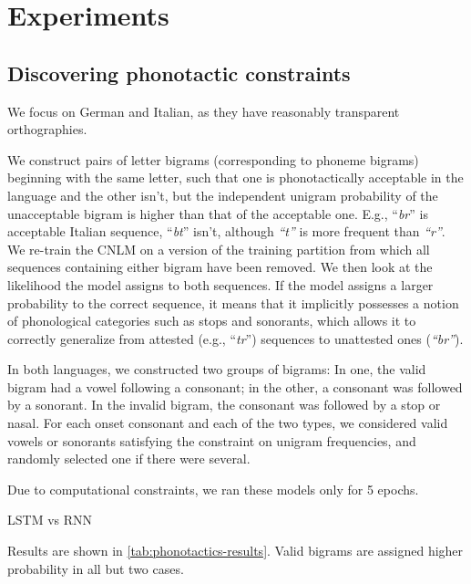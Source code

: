\section{Experiments}
\label{sec:experiments}

\subsection{Discovering phonotactic constraints}
\label{sec:phonotactics}

We focus on German and Italian, as they have reasonably transparent orthographies.


We construct pairs of letter bigrams (corresponding to phoneme
bigrams) beginning with the same letter, such that one is
phonotactically acceptable in the language and the other isn't, but
the independent unigram probability of the unacceptable bigram is
higher than that of the acceptable one. E.g., ``\emph{br}'' is
acceptable Italian sequence, ``\emph{bt}'' isn't, although
\emph{``t''} is more frequent than \emph{``r''}. We re-train the CNLM on a version of
the training partition from which all sequences containing either bigram have been removed. We then look at
the likelihood the model assigns to both sequences. If the model
assigns a larger probability to the correct sequence, it means that it
implicitly possesses a notion of phonological categories such as
stops and sonorants, which allows it to correctly generalize from
attested (e.g., ``\emph{tr}'') sequences to unattested ones
(\emph{``br''}).


In both languages, we constructed two groups of bigrams:
In one, the valid bigram had a vowel following a consonant; in the other, a consonant was followed by a sonorant.
In the invalid bigram, the consonant was followed by a stop or nasal.
For each onset consonant and each of the two types, we considered valid vowels or sonorants satisfying the constraint on unigram frequencies, and randomly selected one if there were several.


Due to computational constraints, we ran these models only for 5 epochs.

LSTM vs RNN

Results are shown in \ref{tab:phonotactics-results}.
Valid bigrams are assigned higher probability in all but two cases.


